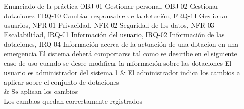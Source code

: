 {\reportauthors}
{Enunciado de la práctica}
{OBJ-01 Gestionar personal, OBJ-02 Gestionar dotaciones}
{FRQ-10 Cambiar responsable de la dotación, FRQ-14 Gestionar usuarios, NFR-01 Privacidad, NFR-02 Seguridad de los datos, NFR-03 Escalabilidad, IRQ-01 Información del usuario, IRQ-02 Información de las dotaciones, IRQ-04 Información acerca de la actuación de una dotación en una emergencia}
{El sistema deberá comportarse tal como se describe en el siguiente caso de uso cuando se desee modificar la información sobre las dotaciones}
{El usuario es administrador del sistema}
{
1 & El administrador indica los cambios a aplicar sobre el conjunto de dotaciones \\  & Se aplican los cambios \\
}
{Los cambios quedan correctamente registrados}
{}


